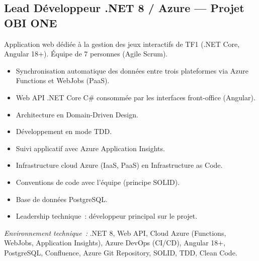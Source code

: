 \documentclass[10pt,a4paper]{article}
\begin{document}
\vspace{4pt}

\subsection*{Lead Développeur .NET 8 / Azure --- Projet OBI ONE}
\color{darkgray}
Application web dédiée à la gestion des jeux interactifs de TF1 (.NET Core, Angular 18+). Équipe de 7 personnes (Agile Scrum).
\begin{itemize}
  \item Synchronisation automatique des données entre trois plateformes via Azure Functions et WebJobs (PaaS).
  \item Web API .NET Core C\# consommée par les interfaces front-office (Angular).
  \item Architecture en Domain-Driven Design.
  \item Développement en mode TDD.
  \item Suivi applicatif avec Azure Application Insights.
  \item Infrastructure cloud Azure (IaaS, PaaS) en Infrastructure as Code.
  \item Conventions de code avec l'équipe (principe SOLID).
  \item Base de données PostgreSQL.
  \item Leadership technique~: développeur principal sur le projet.
\end{itemize}
\textit{Environnement technique~:} .NET 8, Web API, Cloud Azure (Functions, WebJobs, Application Insights), Azure DevOps (CI/CD), Angular 18+, PostgreSQL, Confluence, Azure Git Repository, SOLID, TDD, Clean Code.

\vspace{6pt}
\end{document}

